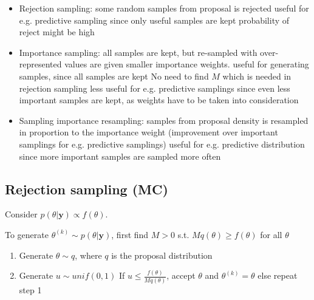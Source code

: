       \begin{itemize}
          \item Rejection sampling:
              \subitem[key] some random samples from proposal is rejected
              \subitem[advantage] useful for e.g. predictive
              sampling since only useful samples are kept
              \subitem[disadvantage] probability of reject
              might be high
          \item Importance sampling:
              \subitem[key] all samples are kept, but re-sampled with
              over-represented values are given smaller importance
              weights.
              \subitem[advantage] useful for generating
              samples, since all samples are kept
              \subitem[advantage] No need to find $M$ which
              is needed in rejection sampling
              \subitem[disadvantage] less useful for e.g.
              predictive samplings since even less important
              samples are kept, as weights have to be taken
              into consideration
          \item Sampling importance resampling:
              \subitem[key] samples from proposal density is resampled in
              proportion to the importance weight
              (improvement over important samplings for e.g.
              predictive samplings)
              \subitem[advantage] useful for e.g. predictive
              distribution since more important samples are
              sampled more often
      \end{itemize}

      \subsection{Rejection sampling (MC)}

      Consider $p(\theta|\mathbf{y})\propto f(\theta)$.

      To generate $\theta^{(k)}\sim p(\theta|\mathbf{y})$,
      first find $M>0$ s.t. $Mq(\theta)\geq  f(\theta)$ for
      all $\theta$

      \begin{enumerate}
          \item Generate $\theta \sim q$, where $q$ is the
              proposal distribution
          \item Generate $u\sim unif(0, 1)$
              \subitem[2.1] If $u \leq
              \frac{f(\theta)}{Mq(\theta)}$, accept $\theta$
              and $\theta^{(k)}=\theta$
              \subitem[2.2] else repeat step 1
      \end{enumerate}

